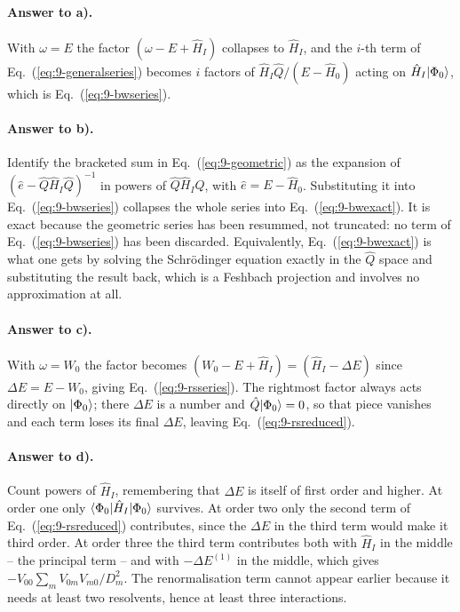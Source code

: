 \paragraph{Answer to a).}
With $\omega=E$ the factor $(\omega-E+\hat{H}_I)$ collapses to $\hat{H}_I$,
and the $i$-th term of Eq.~(\ref{eq:9-generalseries}) becomes $i$ factors of
$\hat{H}_I\hat{Q}/(E-\hat{H}_0)$ acting on $\hat{H}_I\vert \Phi_0 \rangle$, which is
Eq.~(\ref{eq:9-bwseries}).

\paragraph{Answer to b).}
Identify the bracketed sum in Eq.~(\ref{eq:9-geometric}) as the expansion of
$(\hat{e}-\hat{Q}\hat{H}_I\hat{Q})^{-1}$ in powers of
$\hat{Q}\hat{H}_I\hat{Q}$, with $\hat{e}=E-\hat{H}_0$.  Substituting it into
Eq.~(\ref{eq:9-bwseries}) collapses the whole series into
Eq.~(\ref{eq:9-bwexact}).  It is exact because the geometric series has been
resummed, not truncated: no term of Eq.~(\ref{eq:9-bwseries}) has been
discarded.  Equivalently, Eq.~(\ref{eq:9-bwexact}) is what one gets by
solving the Schr\"odinger equation exactly in the $\hat{Q}$ space and
substituting the result back, which is a Feshbach projection and involves no
approximation at all.

\paragraph{Answer to c).}
With $\omega=W_0$ the factor becomes $(W_0-E+\hat{H}_I)=(\hat{H}_I-\Delta E)$
since $\Delta E=E-W_0$, giving Eq.~(\ref{eq:9-rsseries}).  The rightmost
factor always acts directly on $\vert \Phi_0 \rangle$; there $\Delta E$ is a number
and $\hat{Q}\vert \Phi_0 \rangle=0$, so that piece vanishes and each term loses its
final $\Delta E$, leaving Eq.~(\ref{eq:9-rsreduced}).

\paragraph{Answer to d).}
Count powers of $\hat{H}_I$, remembering that $\Delta E$ is itself of first
order and higher.  At order one only $\langle \Phi_0 | \hat{H}_I | \Phi_0 \rangle$
survives.  At order two only the second term of
Eq.~(\ref{eq:9-rsreduced}) contributes, since the $\Delta E$ in the third
term would make it third order.  At order three the third term contributes
both with $\hat{H}_I$ in the middle -- the principal term -- and with
$-\Delta E^{(1)}$ in the middle, which gives
$-V_{00}\sum_m V_{0m}V_{m0}/D_m^2$.  The renormalisation term cannot appear
earlier because it needs at least two resolvents, hence at least three
interactions.

